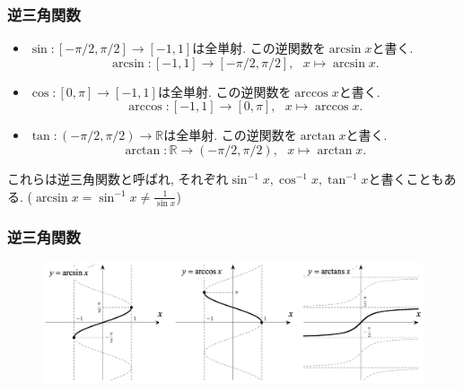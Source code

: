 \documentclass[dvipdfmx,cjk,10.2pt]{beamer}
\newcommand{\R}{\mathbb{R}}
\theoremstyle{definition}
\begin{document}
\begin{frame}
\frametitle{逆三角関数}

\begin{itemize}
\item $\sin:[-\pi/2,\pi/2]\rightarrow [-1,1]$は全単射. 
この逆関数を$\arcsin x$と書く. 
$$
\arcsin: [-1,1] \longrightarrow [-\pi/2,\pi/2], \ \ \ x \mapsto \arcsin x. 
$$
\item $\cos:[0,\pi]\rightarrow [-1,1]$は全単射. 
この逆関数を$\arccos x$と書く. 
$$
\arccos: [-1,1] \longrightarrow [0,\pi], \ \ \ x \mapsto \arccos x. 
$$
\item $\tan:(-\pi/2,\pi/2)\rightarrow \R$は全単射. 
この逆関数を$\arctan x$と書く. 
$$
\arctan: \R \longrightarrow (-\pi/2,\pi/2), \ \ \ x \mapsto \arctan x. 
$$
\end{itemize}
これらは逆三角関数と呼ばれ, それぞれ$\sin^{-1}x, \cos^{-1}x,\tan^{-1}x$と書くこともある. 
($\arcsin x = \sin^{-1}x \neq \frac{1}{\sin x}$)




\end{frame}





\begin{frame}
\frametitle{逆三角関数}



 \begin{figure}[htbp]
 \begin{center} 
  \includegraphics[width=120mm]{inv_trig.png}
 \end{center}
\end{figure}


\end{frame}


\end{document}

